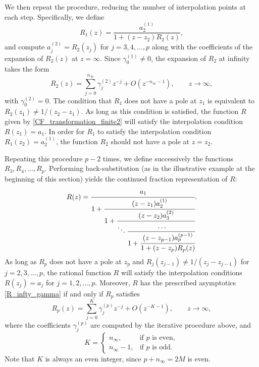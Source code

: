\documentclass[12pt]{article}
\begin{document}
We then repeat the procedure, reducing the number of interpolation points at each step. Specifically, we define
\begin{equation*}
R_1(z)=\frac{a^{(1)}_2}{1+(z-z_2) R_2(z)}, 
\end{equation*}
and compute $a_j^{(2)}=R_2(z_j)$ for $j=3,4,\dots,p$ along with the coefficients of the expansion of $R_2(z)$ at $z=\infty$. Since $\gamma_0^{(1)}\neq 0$, the expansion of $R_2$ at infinity takes the form
\begin{equation*}
R_2(z)=\sum_{j=0}^{n_{\infty}} \gamma^{(2)}_j z^{-j}+O(z^{-n_{\infty}-1}), \qquad z\to \infty,
\end{equation*}
with $\gamma_0^{(2)}=0$.  The condition that $R_1$ does not have a pole at $z_1$ is equivalent to $R_2(z_1) \neq 1/(z_2-z_1)$. As long as this condition is satisfied, the function $R$ given by 
\eqref{CF_transformation_finite2} will satisfy the interpolation condition $R(z_1)=a_1$. In order for $R_1$ to satisfy the interpolation condition $R_1(z_2)=a_2^{(1)}$, the function $R_2$ should not have a pole at $z=z_2$. 

Repeating this procedure $p-2$ times, we define successively the functions $R_3, R_4, \dots, R_p$. Performing back-substitution (as in the illustrative example at the beginning of this section) yields the continued fraction representation of $R$: 
\begin{equation}\label{R_as_CF_ending_in_Rp}
R(z)=\cfrac{a_1}{1+\cfrac{(z-z_1) a^{(1)}_2}
{1+\cfrac{(z-z_2) a^{(2)}_3}{\ddots \cfrac{\;\;\dots\;\;}
{1+\cfrac{(z-z_{p-1}) a^{(p-1)}_p}{1+(z-z_p) R_p(z)}}}}}.
\end{equation}
As long as $R_p$ does not have a pole at $z_p$ and $R_j(z_{j-1}) \neq 1/(z_j-z_{j-1})$ for $j=2,3,\dots,p$, the rational function $R$ will satisfy the interpolation conditions $R(z_j)=a_j$ for $j=1,2,\dots,p$. 
Moreover, $R$ has the prescribed asymptotics \eqref{R_infty_gamma} if and only if $R_p$ satisfies  
\begin{equation}\label{eqn_R_p_at_infty}
R_p(z)=\sum_{j=0}^K \gamma^{(p)}_j z^{-j} + O(z^{-K-1}), \qquad z\to \infty,
\end{equation}
where the coefficients $\gamma_j^{(p)}$ are computed by the iterative procedure above, and 
\[
K=\begin{cases}
n_{\infty}, & \text{if $p$ is even}, \\
n_{\infty}-1, & \text{if $p$ is odd}.
\end{cases}
\]
Note that $K$ is always an even integer, since $p+n_{\infty}=2M$ is even.  
 
\end{document}
